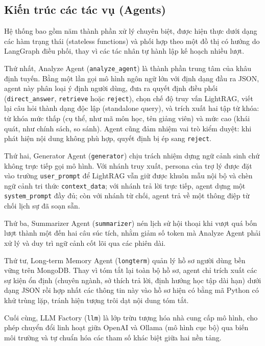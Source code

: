\subsection{Kiến trúc các tác vụ (Agents)}

Hệ thống bao gồm năm thành phần xử lý chuyên biệt, được hiện thực dưới dạng các hàm trạng thái (stateless functions) và phối hợp theo một đồ thị có hướng do LangGraph điều phối, thay vì các tác nhân tự hành lập kế hoạch nhiều lượt.

Thứ nhất, Analyze Agent (\texttt{analyze\_agent}) là thành phần trung tâm của khâu định tuyến. Bằng một lần gọi mô hình ngôn ngữ lớn với định dạng đầu ra JSON, agent này phân loại ý định người dùng, đưa ra quyết định điều phối (\texttt{direct\_answer}, \texttt{retrieve} hoặc \texttt{reject}), chọn chế độ truy vấn LightRAG, viết lại câu hỏi thành dạng độc lập (standalone query), và trích xuất hai tập từ khóa: từ khóa mức thấp (cụ thể, như mã môn học, tên giảng viên) và mức cao (khái quát, như chính sách, so sánh). Agent cũng đảm nhiệm vai trò kiểm duyệt: khi phát hiện nội dung không phù hợp, quyết định bị ép sang \texttt{reject}.

Thứ hai, Generator Agent (\texttt{generator}) chịu trách nhiệm dựng ngữ cảnh sinh chứ không trực tiếp gọi mô hình. Với nhánh truy xuất, persona của trợ lý được đặt vào trường \texttt{user\_prompt} để LightRAG vẫn giữ được khuôn mẫu nội bộ và chèn ngữ cảnh tri thức \texttt{context\_data}; với nhánh trả lời trực tiếp, agent dựng một \texttt{system\_prompt} đầy đủ; còn với nhánh từ chối, agent trả về một thông điệp từ chối lịch sự đã soạn sẵn.

Thứ ba, Summarizer Agent (\texttt{summarizer}) nén lịch sử hội thoại khi vượt quá bốn lượt thành một đến hai câu súc tích, nhằm giảm số token mà Analyze Agent phải xử lý và duy trì ngữ cảnh cốt lõi qua các phiên dài.

Thứ tư, Long-term Memory Agent (\texttt{longterm}) quản lý hồ sơ người dùng bền vững trên MongoDB. Thay vì tóm tắt lại toàn bộ hồ sơ, agent chỉ trích xuất các sự kiện ổn định (chuyên ngành, sở thích trả lời, định hướng học tập dài hạn) dưới dạng JSON rồi hợp nhất các thông tin này vào hồ sơ hiện có bằng mã Python có khử trùng lặp, tránh hiện tượng trôi dạt nội dung tóm tắt.

Cuối cùng, LLM Factory (\texttt{llm}) là lớp trừu tượng hóa nhà cung cấp mô hình, cho phép chuyển đổi linh hoạt giữa OpenAI và Ollama (mô hình cục bộ) qua biến môi trường và tự chuẩn hóa các tham số khác biệt giữa hai nền tảng.

